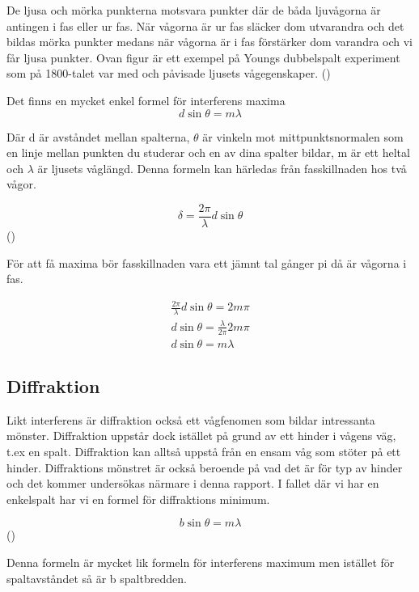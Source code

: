 \documentclass[a4paper]{article}
\begin{document}
De ljusa och mörka punkterna motsvara punkter där de båda ljuvågorna är antingen i fas eller ur fas. När vågorna är ur fas släcker dom utvarandra och det bildas mörka punkter medans när vågorna är i fas förstärker dom varandra och vi får ljusa punkter. Ovan figur är ett exempel på Youngs dubbelspalt experiment som på 1800-talet var med och påvisade ljusets vågegenskaper. 
(\cite{Hecht2017})

Det finns en mycket enkel formel för interferens maxima
\begin{equation}
    d\sin\theta = m \lambda
\end{equation}

Där d är avståndet mellan spalterna, $\theta$ är vinkeln mot mittpunktsnormalen som en linje mellan punkten du studerar och en av dina spalter bildar, m är ett heltal och $\lambda$ är ljusets våglängd. Denna formeln kan härledas från fasskillnaden hos två vågor. 

\begin{equation}
    \delta = \frac{2\pi}{\lambda}d\sin\theta
\end{equation}
(\cite{PH})

För att få maxima bör fasskillnaden vara ett jämnt tal gånger pi då är vågorna i fas.

\begin{align}
    \frac{2\pi}{\lambda}d\sin\theta = 2m \pi \\
    d \sin\theta = \frac{\lambda}{2\pi} 2m \pi \\
    d \sin\theta = m \lambda
\end{align}

\subsection{Diffraktion}

Likt interferens är diffraktion också ett vågfenomen som bildar intressanta mönster. Diffraktion uppstår dock istället på grund av ett hinder i vågens väg, t.ex en spalt. Diffraktion kan alltså uppstå från en ensam våg som stöter på ett hinder. Diffraktions mönstret är också beroende på vad det är för typ av hinder och det kommer undersökas närmare i denna rapport. I fallet där vi har en enkelspalt har vi en formel för diffraktions minimum.

\begin{equation}
    b\sin\theta = m\lambda
\end{equation}
(\cite{PH})

Denna formeln är mycket lik formeln för interferens maximum men istället för spaltavståndet så är b spaltbredden. 
\end{document}
